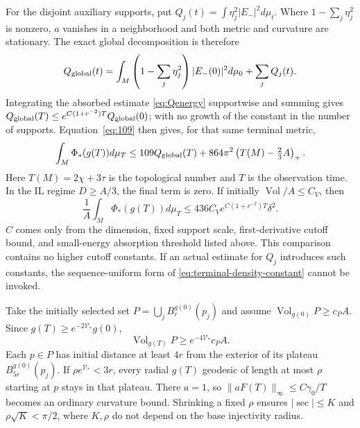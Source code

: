 \documentclass[a4paper,11pt]{article}
\numberwithin{equation}{section}
\theoremstyle{definition}
\newcommand{\Vol}{\operatorname{Vol}}
\begin{document}
For the disjoint auxiliary supports, put $Q_j(t)=\int\eta_j^2|E_-|^2d\mu_t$.
Where $1-\sum_j\eta_j^2$ is nonzero, $a$ vanishes in a neighborhood and both metric and curvature are stationary.
The exact global decomposition is therefore
\begin{equation}\label{eq:global-stationary-Q}
Q_{\rm global}(t)
=\int_M\left(1-\sum_j\eta_j^2\right)|E_-(0)|^2d\mu_0
+\sum_jQ_j(t).
\end{equation}
Integrating the absorbed estimate \eqref{eq:Qenergy} supportwise and summing gives
$Q_{\rm global}(T)\le e^{C(1+r^{-2})T}Q_{\rm global}(0)$;
with no growth of the constant in the number of supports. Equation~\eqref{eq:109} then gives, for that same terminal metric,
\[
\int_M\Phi_*(g(T))d\mu_T
\le109Q_{\rm global}(T)
 +864\pi^2\left(T(M)-\tfrac23A\right)_+.
\]
Here $T(M)=2\chi+3\tau$ is the topological number and $T$ is the observation time.
In the IL regime $D\ge A/3$, the final term is zero. If initially $\Vol/A\le C_V$, then
\begin{equation}\label{eq:terminal-density-constant}
\frac1A\int_M\Phi_*(g(T))d\mu_T
\le436C_V e^{C(1+r^{-2})T}\delta^2.
\end{equation}
$C$ comes only from the dimension, fixed support scale, first-derivative cutoff bound, and small-energy absorption threshold listed above.
This comparison contains no higher cutoff constants. If an actual estimate for $Q_j$ introduces such constants,
the sequence-uniform form of \eqref{eq:terminal-density-constant} cannot be invoked.

Take the initially selected set $P=\bigcup_jB_r^{g(0)}(p_j)$ and assume
$\Vol_{g(0)}P\ge c_PA$. Since $g(T)\ge e^{-2\mathcal V_*}g(0)$,
\[
\Vol_{g(T)}P\ge e^{-4\mathcal V_*}c_PA.
\]
Each $p\in P$ has initial distance at least $4r$ from the exterior of its plateau $B_{5r}^{g(0)}(p_j)$.
If $\rho e^{\mathcal V_*}<3r$, every radial $g(T)$ geodesic of length at most $\rho$ starting at $p$
stays in that plateau. There $a=1$, so
$\|aF(T)\|_\infty\le C\gamma_0/T$ becomes an ordinary curvature bound.
Shrinking a fixed $\rho$ ensures $|\sec|\le K$ and $\rho\sqrt K<\pi/2$,
where $K,\rho$ do not depend on the base injectivity radius.
\end{document}
